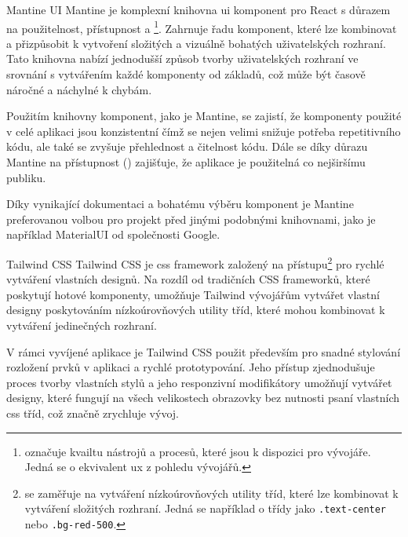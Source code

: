 \begin{subsection}{Mantine UI}
    \label{subsec:implementace-technologie-mantine}
    Mantine je komplexní knihovna \ac{ui} komponent pro React s důrazem na použitelnost, přístupnost a \footnote{ označuje kvailtu nástrojů a procesů, které jsou k dispozici pro vývojáře.
    Jedná se o ekvivalent \acl{ux} z pohledu vývojářů.}.
    Zahrnuje řadu komponent, které lze kombinovat a přizpůsobit k vytvoření složitých a vizuálně bohatých uživatelských rozhraní.
    Tato knihovna nabízí jednodušší způsob tvorby uživatelských rozhraní ve srovnání s vytvářením každé komponenty od základů, což může být časově náročné a náchylné k chybám.

    Použitím knihovny komponent, jako je Mantine, se zajistí, že komponenty použité v celé aplikaci jsou konzistentní čímž se nejen velimi snižuje potřeba repetitivního kódu, ale také se zvyšuje přehlednost a čitelnost kódu.
    Dále se díky důrazu Mantine na přístupnost () zajišťuje, že aplikace je použitelná co nejširšímu publiku\cite{m__mantine_dev}.

    Díky vynikající dokumentaci a bohatému výběru komponent je Mantine preferovanou volbou pro projekt před jinými podobnými knihovnami, jako je například MaterialUI od společnosti Google\cite{m__mui_com}.
\end{subsection}

\begin{subsection}{Tailwind CSS}
    \label{subsec:implementace-technologie-tailwind}
    Tailwind CSS je \ac{css} framework založený na  přístupu\footnote{ se zaměřuje na vytváření nízkoúrovňových utility tříd, které lze kombinovat k vytváření složitých rozhraní.
    Jedná se například o třídy jako \texttt{.text-center} nebo \texttt{.bg-red-500}.} pro rychlé vytváření vlastních designů.
    Na rozdíl od tradičních CSS frameworků, které poskytují hotové komponenty, umožňuje Tailwind vývojářům vytvářet vlastní designy poskytováním nízkoúrovňových utility tříd, které mohou kombinovat k vytváření jedinečných rozhraní\cite{tc__tailwindcss_com}.

    V rámci vyvíjené aplikace je Tailwind CSS použit především pro snadné stylování rozložení prvků v aplikaci a rychlé prototypování.
    Jeho  přístup zjednodušuje proces tvorby vlastních stylů a jeho responzivní modifikátory umožňují vytvářet designy, které fungují na všech velikostech obrazovky bez nutnosti psaní vlastních \ac{css} tříd\cite{tc__tailwindcss_com}, což značně zrychluje vývoj.
\end{subsection}

